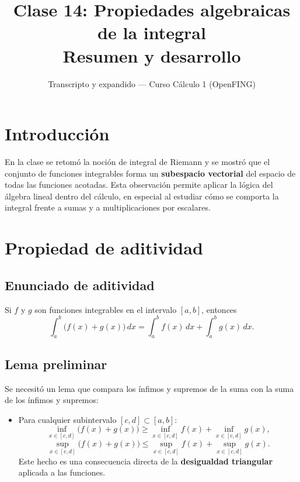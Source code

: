 \documentclass[12pt,a4paper]{article}
\title{\textbf{Clase 14: Propiedades algebraicas de la integral}\\\large{Resumen y desarrollo}}
\author{Transcripto y expandido --- Curso Cálculo 1 (OpenFING)}
\date{}
\begin{document}
\maketitle
\tableofcontents
\newpage

\section{Introducción}
En la clase se retomó la noción de integral de Riemann y se mostró que el conjunto de funciones integrables forma un \textbf{subespacio vectorial} del espacio de todas las funciones acotadas.  Esta observación permite aplicar la lógica del álgebra lineal dentro del cálculo, en especial al estudiar cómo se comporta la integral frente a sumas y a multiplicaciones por escalares.

\section{Propiedad de aditividad}

\subsection{Enunciado de aditividad}
\begin{keybox}
Si $f$ y $g$ son funciones integrables en el intervalo $[a,b]$, entonces
\[
\int_{a}^{b} \bigl(f(x)+g(x)\bigr)\,dx = \int_{a}^{b} f(x)\,dx + \int_{a}^{b} g(x)\,dx.
\]
\end{keybox}

\subsection{Lema preliminar}
Se necesitó un lema que compara los ínfimos y supremos de la suma con la suma de los ínfimos y supremos:
\begin{itemize}
  \item Para cualquier subintervalo $[c,d]\subset[a,b]$:
  \[
  \inf_{x\in[c,d]}\bigl(f(x)+g(x)\bigr) \ge \inf_{x\in[c,d]} f(x) + \inf_{x\in[c,d]} g(x),
  \]
  \[
  \sup_{x\in[c,d]}\bigl(f(x)+g(x)\bigr) \le \sup_{x\in[c,d]} f(x) + \sup_{x\in[c,d]} g(x).
  \]
Este hecho es una consecuencia directa de la \textbf{desigualdad triangular} aplicada a las funciones.
\end{itemize}
\end{document}

